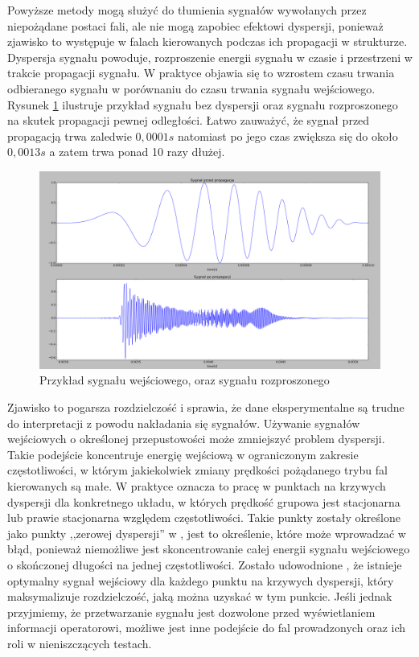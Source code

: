 Powyższe metody mogą służyć do tłumienia sygnałów wywołanych przez niepożądane postaci fali, ale nie mogą zapobiec efektowi dyspersji, ponieważ zjawisko to występuje w falach kierowanych podczas ich propagacji w strukturze. Dyspersja sygnału powoduje, rozproszenie energii sygnału w czasie i przestrzeni w trakcie propagacji sygnału. W praktyce objawia się to wzrostem czasu trwania odbieranego sygnału w porównaniu do czasu trwania sygnału wejściowego. Rysunek \ref{fig:dyspersja} ilustruje przykład sygnału bez dyspersji oraz sygnału rozproszonego na skutek propagacji pewnej odległości. Łatwo zauważyć, że sygnał przed propagacją trwa zaledwie $0,0001 s$ natomiast po jego czas zwiększa się do około $0,0013s$ a zatem trwa ponad 10 razy dłużej.
\begin{figure}[h]
\centering
\includegraphics[width=14cm]{Zdjecia/4/dyspersja}
\caption{Przykład sygnału wejściowego, oraz sygnału rozproszonego}
\label{fig:dyspersja}
\end{figure}

 Zjawisko to pogarsza rozdzielczość i sprawia, że dane eksperymentalne są trudne do interpretacji z powodu nakładania się sygnałów. Używanie sygnałów wejściowych o określonej przepustowości może zmniejszyć problem dyspersji. Takie podejście koncentruje energię wejściową w ograniczonym zakresie częstotliwości, w którym jakiekolwiek zmiany prędkości pożądanego trybu fal kierowanych są małe. W praktyce oznacza to pracę w punktach na krzywych dyspersji dla konkretnego układu, w których prędkość grupowa jest stacjonarna lub prawie stacjonarna względem częstotliwości. Takie punkty zostały określone jako punkty ,,zerowej dyspersji'' w \cite{kasia1}, jest to określenie, które może wprowadzać w błąd, ponieważ niemożliwe jest skoncentrowanie całej energii sygnału wejściowego o skończonej długości na jednej częstotliwości. Zostało udowodnione \cite{kasia2}, że istnieje optymalny sygnał wejściowy dla każdego punktu na krzywych dyspersji, który maksymalizuje rozdzielczość, jaką można uzyskać w tym punkcie. Jeśli jednak przyjmiemy, że przetwarzanie sygnału jest dozwolone przed wyświetlaniem informacji operatorowi, możliwe jest inne podejście do fal prowadzonych oraz ich roli w nieniszczących testach.

